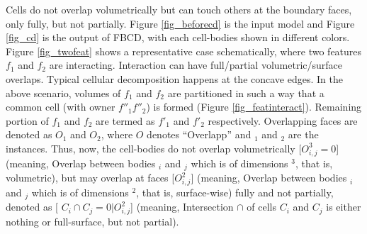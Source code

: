 Cells do not overlap volumetrically but can touch others at the boundary faces, only fully, but not partially.   Figure \ref{fig_beforecd} is the input model and Figure \ref{fig_cd} is the output of FBCD, with each cell-bodies shown in different colors. Figure \ref{fig_twofeat} shows a representative case schematically, where two features $f_1$ and $f_2$ are interacting. Interaction can have full/partial volumetric/surface overlaps. Typical cellular decomposition happens at the concave edges. In the above scenario, volumes of $f_1$ and $f_2$ are partitioned in such a way that a common cell (with owner $f''_1f''_2$) is formed (Figure \ref{fig_featinteract}). Remaining portion of $f_1$ and $f_2$ are termed as $f'_1$ and $f'_2$ respectively.  Overlapping faces are denoted as $O_1$ and $O_2$, where $O$ denotes ``Overlapp'' and $_1$ and $_2$ are the instances. Thus, now, the cell-bodies do not overlap volumetrically [$O_{i,j}^3 = 0$] (meaning, Overlap between bodies $_i$ and $_j$ which is of dimensions $^3$, that is, volumetric), but may overlap at faces [$O_{i,j}^2$] (meaning, Overlap between bodies $_i$ and $_j$ which is of dimensions $^2$, that is, surface-wise) fully and not partially, denoted as [ $C_i \cap C_j = 0| O_{i,j}^2$] (meaning, Intersection $\cap$ of cells $C_i$ and $C_j$ is either nothing or full-surface, but not partial).



